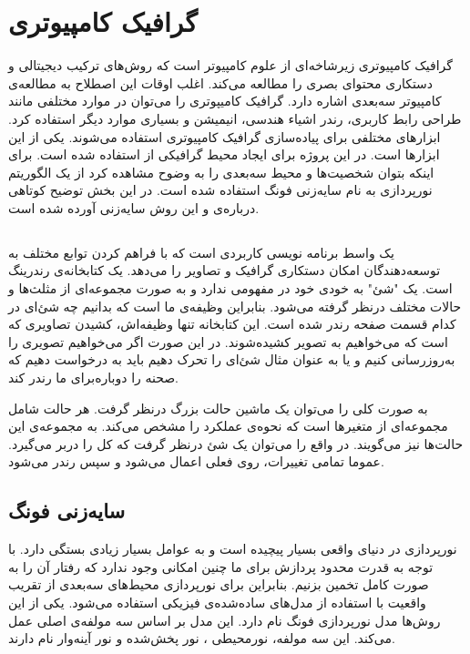 \section{گرافیک کامپیوتری}

گرافیک کامپیوتری زیرشاخه‌ای از علوم کامپیوتر است که روش‌های 
ترکیب دیجیتالی و دستکاری محتوای بصری 
را مطالعه می‌کند.
اغلب اوقات این اصطلاح به مطالعه‌ی 
کامپیوتر سه‌بعدی اشاره دارد.
\cite{ComputerGraphicsWikipedia}
گرافیک کامیپوتری را می‌توان در 
موارد مختلفی مانند طراحی رابط کاربری،
رندر اشیاء هندسی، انیمیشن و بسیاری 
موارد دیگر استفاده کرد.
ابزارهای مختلفی برای پیاده‌سازی گرافیک کامپیوتری استفاده می‌شوند.
یکی از این ابزار‌ها 
است.
در این پروژه برای ایجاد محیط گرافیکی از 
استفاده شده است.
برای اینکه بتوان شخصیت‌ها و محیط سه‌بعدی را به وضوح مشاهده کرد از یک الگوریتم نورپردازی به نام 
سایه‌زنی فونگ استفاده شده است.
در این بخش توضیح کوتاهی دربا‌ره‌ی
 و
این روش سایه‌زنی آورده شده است.

\subsection {
    }

یک واسط برنامه نویسی کاربردی  
است که با فراهم کردن توابع مختلف به توسعه‌دهندگان امکان دستکاری گرافیک و تصاویر را می‌دهد.
یک کتابخانه‌ی رندرینگ است.
یک "شئ" به خودی خود در
مفهومی ندارد
و به صورت مجموعه‌ای از مثلث‌ها و حالات مختلف درنظر گرفته می‌شود. بنابراین  
وظیفه‌ی ما است که بدانیم چه شئ‌ای در کدام قسمت صفحه رندر شده است. این کتابخانه تنها وظیفه‌اش، کشیدن تصاویری که است که می‌خواهیم به تصویر کشیده‌شوند.
در این صورت اگر می‌خواهیم تصویری را به‌روزرسانی کنیم و یا به عنوان مثال شئ‌ای را تحرک دهیم باید به 
درخواست دهیم که صحنه را دوباره‌برای ما رندر کند.
\cite{KhronosUsingOpenGL}

به صورت کلی 
را می‌توان یک ماشین حالت بزرگ درنظر گرفت. هر حالت شامل مجموعه‌ای از متغیر‌ها است که نحوه‌ی عملکرد
را مشخص می‌کند. 
به مجموعه‌ی این حالت‌ها 
نیز می‌گویند. 
در واقع  
را می‌توان یک شئ درنظر گرفت که کل
را دربر می‌گیرد. عموما تمامی تغییرات، روی 
فعلی اعمال می‌شود و سپس رندر می‌شود.
\cite{KhronosUsingOpenGL} \cite{LearnOpenGL_GettingStarted}


\subsection{سایه‌زنی فونگ}
\label{PhongShading}
نورپردازی در دنیای واقعی بسیار پیچیده است و
به عوامل بسیار زیادی بستگی دارد. با توجه به 
قدرت محدود پردازش برای ما چنین امکانی وجود ندارد که رفتار آن را 
به صورت کامل تخمین بزنیم.
بنابراین برای نورپردازی محیط‌های سه‌بعدی از تقریب‌ واقعیت 
با استفاده از مدل‌های ساده‌شده‌ی فیزیکی استفاده می‌شود.
یکی از این روش‌ها مدل نورپردازی فونگ نام دارد.
این مدل بر اساس سه مولفه‌ی اصلی عمل می‌کند.
این سه ‌مولفه، نورمحیطی
، نور پخش‌شده
و نور آینه‌وار
نام دارند.
\cite{LearnOpenGLPhongShading}
